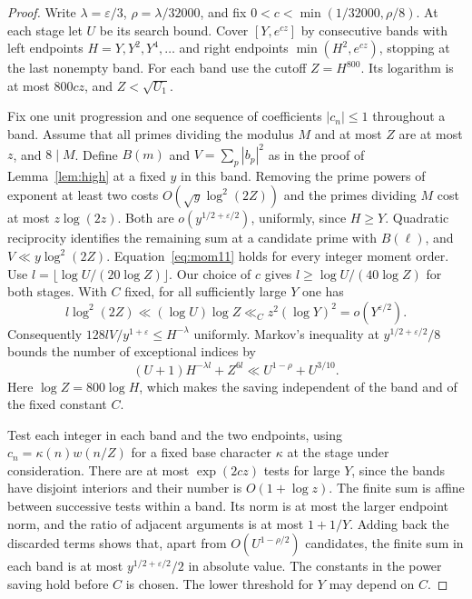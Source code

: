 \documentclass[a4paper,11pt]{article}
\theoremstyle{definition}
\theoremstyle{remark}
\numberwithin{equation}{section}
\begin{document}
\begin{proof}
Write \(\lambda=\varepsilon/3\), \(\rho=\lambda/32000\), and fix
\(0<c<\min(1/32000,\rho/8)\). At each stage let \(U\) be its
search bound. Cover \([Y,e^{cz}]\) by consecutive bands with left
endpoints \(H=Y,Y^2,Y^4,\ldots\) and right endpoints
\(\min(H^2,e^{cz})\), stopping at the last nonempty band.
For each band use the cutoff \(Z=H^{800}\). Its logarithm is at
most \(800cz\), and \(Z<\sqrt{U_1}\).

Fix one unit progression and one sequence of coefficients
\(|c_n|\le1\) throughout a band. Assume that all primes dividing
the modulus \(M\) and at most \(Z\) are at most \(z\), and
\(8\mid M\). Define \(B(m)\) and \(V=\sum_p|b_p|^2\) as in the proof
of Lemma~\ref{lem:high} at a fixed \(y\) in this band. Removing
the prime powers of exponent at least two costs
\(O(\sqrt y\log^2(2Z))\) and the primes dividing \(M\) cost at most
\(z\log(2z)\). Both are \(o(y^{1/2+\varepsilon/2})\), uniformly,
since \(H\ge Y\). Quadratic reciprocity identifies the remaining sum
at a candidate prime with \(B(\ell)\), and
\(V\ll y\log^2(2Z)\). Equation~\eqref{eq:mom11} holds for every
integer moment order. Use \(l=\lfloor\log U/(20\log Z)\rfloor\).
Our choice of \(c\) gives \(l\ge\log U/(40\log Z)\) for both
stages. With \(C\) fixed, for all sufficiently large \(Y\) one has
\[
 l\log^2(2Z)\ll (\log U)\log Z
       \ll_C z^2(\log Y)^2=o(Y^{\varepsilon/2}).
\]
Consequently \(128lV/y^{1+\varepsilon}\le H^{-\lambda}\)
uniformly. Markov's inequality at \(y^{1/2+\varepsilon/2}/8\)
bounds the number of exceptional indices by
\[
  (U+1)H^{-\lambda l}+Z^{6l}
     \ll U^{1-\rho}+U^{3/10}.
\]
Here \(\log Z=800\log H\), which makes the saving independent
of the band and of the fixed constant \(C\).

Test each integer in each band and the two endpoints, using
\(c_n=\kappa(n)w(n/Z)\) for a fixed base character \(\kappa\)
at the stage under consideration. There are at most
\(\exp(2cz)\) tests for large \(Y\), since the bands have disjoint
interiors and their number is \(O(1+\log z)\). The finite sum is
affine between successive tests within a band. Its norm is at
most the larger endpoint norm, and the ratio of adjacent arguments
is at most \(1+1/Y\). Adding back the discarded terms shows that,
apart from \(O(U^{1-\rho/2})\) candidates, the finite sum in each
band is at most \(y^{1/2+\varepsilon/2}/2\) in absolute value.
The constants in the power saving hold before \(C\) is chosen.
The lower threshold for \(Y\) may depend on \(C\).


\end{proof}
\end{document}

